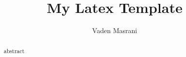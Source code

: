 

\title{My Latex Template}
\author{Vaden Masrani}



\maketitle
\begin{abstract}
abstract
\end{abstract}





\clearpage
\appendix



